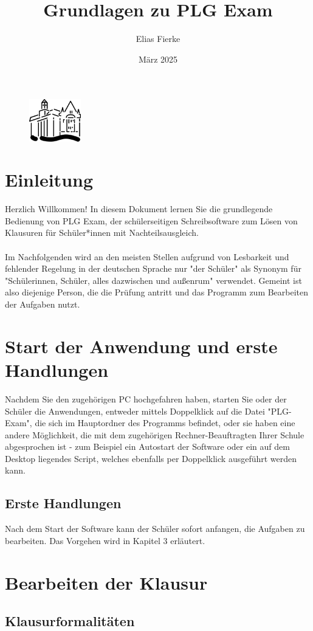 \documentclass[]{article}
\title{Grundlagen zu PLG Exam}
\date{März 2025}
\author{Elias Fierke}
\begin{document}
	\begin{figure}
	\centering
		\includegraphics[width=0.2\textwidth]{plgicon.png}
	\label{fig:logo}
	\end{figure}
	\maketitle
	\tableofcontents
	\newpage
	\section{Einleitung}
	Herzlich Willkommen! In diesem Dokument lernen Sie die grundlegende Bedienung von PLG Exam, der schülerseitigen Schreibsoftware zum Lösen von Klausuren für Schüler*innen mit Nachteilsausgleich.\\\\
    Im Nachfolgenden wird an den meisten Stellen aufgrund von Lesbarkeit und fehlender Regelung in der deutschen Sprache nur "der Schüler" als Synonym für "Schülerinnen, Schüler, alles dazwischen und außenrum" verwendet. Gemeint ist also diejenige Person, die die Prüfung antritt und das Programm zum Bearbeiten der Aufgaben nutzt.
	
    \newpage
    \section{Start der Anwendung und erste Handlungen}
    Nachdem Sie den zugehörigen PC hochgefahren haben, starten Sie oder der Schüler die Anwendungen, entweder mittels Doppelklick auf die Datei "PLG-Exam", die sich im Hauptordner des Programms befindet, oder sie haben eine andere Möglichkeit, die mit dem zugehörigen Rechner-Beauftragten Ihrer Schule abgesprochen ist - zum Beispiel ein Autostart der Software oder ein auf dem Desktop liegendes Script, welches ebenfalls per Doppelklick ausgeführt werden kann.\\
    \subsection{Erste Handlungen}
    Nach dem Start der Software kann der Schüler sofort anfangen, die Aufgaben zu bearbeiten. Das Vorgehen wird in Kapitel 3 erläutert.

    \newpage
    \section{Bearbeiten der Klausur}
    \subsection{Klausurformalitäten}
    
\end{document}
